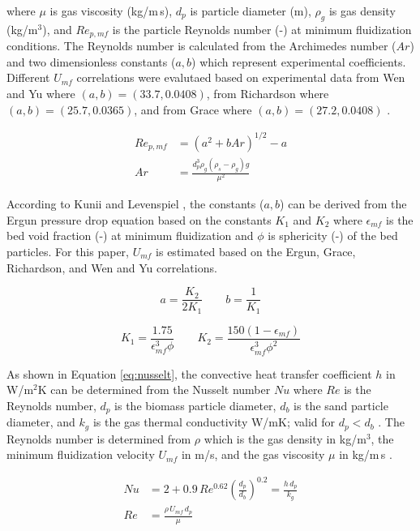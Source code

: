 \noindent where $\mu$ is gas viscosity (kg/m\,s), $d_p$ is particle diameter (m), $\rho_g$ is gas density (kg/m$^3$), and $Re_{p,mf}$ is the particle Reynolds number (-) at minimum fluidization conditions. The Reynolds number is calculated from the Archimedes number ($Ar$) and two dimensionless constants ($a, b$) which represent experimental coefficients. Different $U_{mf}$ correlations were evalutaed based on experimental data from Wen and Yu where $(a, b) = (33.7, 0.0408)$, from Richardson where $(a, b) = (25.7, 0.0365)$, and from Grace where $(a, b) = (27.2, 0.0408)$ \cite{Levenspiel-1991}.

\begin{align}
    Re_{p,mf} &= \left( a^2 + b Ar \right)^{1/2} - a \\
    Ar &= \frac{d_p^3 \rho_g (\rho_s - \rho_g) g}{\mu^2}
\end{align}

According to Kunii and Levenspiel \cite{Levenspiel-1991}, the constants ($a, b$) can be derived from the Ergun pressure drop equation based on the constants $K_1$ and $K_2$ where $\epsilon_{mf}$ is the bed void fraction (-) at minimum fluidization and $\phi$ is sphericity (-) of the bed particles. For this paper, $U_{mf}$ is estimated based on the Ergun, Grace, Richardson, and Wen and Yu correlations.

\begin{equation}
    a = \frac{K_2}{2 K_1} \qquad
    b = \frac{1}{K_1}
\end{equation}

\begin{equation}
    K_1 = \frac{1.75}{\epsilon_{mf}^3 \phi} \qquad
    K_2 = \frac{150(1-\epsilon_{mf})}{\epsilon_{mf}^3 \phi^2}
\end{equation}

As shown in Equation \ref{eq:nusselt}, the convective heat transfer coefficient $h$ in W/m$^2$K can be determined from the Nusselt number $Nu$ where $Re$ is the Reynolds number, $d_p$ is the biomass particle diameter, $d_b$ is the sand particle diameter, and $k_g$ is the gas thermal conductivity W/mK; valid for $d_p < d_b$ \cite{Collier-2004}. The Reynolds number is determined from $\rho$ which is the gas density in kg/m$^3$, the minimum fluidization velocity $U_{mf}$ in m/s, and the gas viscosity $\mu$ in kg/m\,s \cite{Papadikis-2010}.

\begin{align}
    Nu &= 2 + 0.9\, Re^{0.62} \left(\frac{d_p}{d_b}\right)^{0.2} = \frac{h\, d_p}{k_g} \label{eq:nusselt} \\
    Re &= \frac{\rho\, U_{mf}\, d_p}{\mu} \label{eq:reynolds} \\
\end{align}

